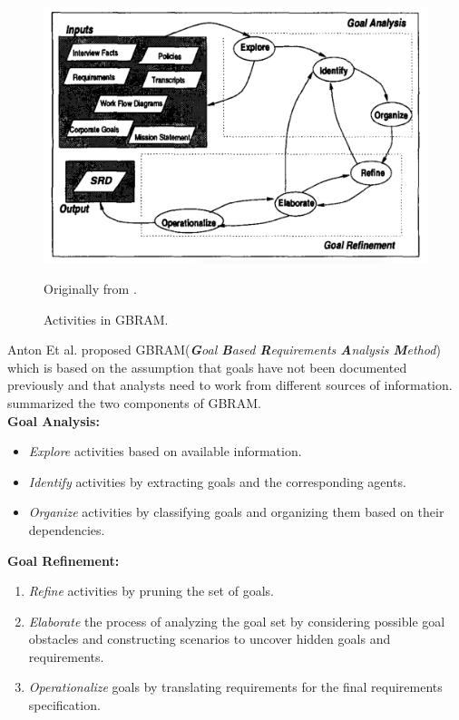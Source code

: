 \begin{figure}[hbtp]
    \centering
    \includegraphics[width=\textwidth]{Chapter-2/figs/GBRAM}
    \caption{Activities in GBRAM.}
    \medskip
    \small
    Originally from \cite{anton98}.
    \label{fig:gbram}
\end{figure}

Anton Et al. proposed GBRAM(\textit{\textbf{G}oal \textbf{B}ased \textbf{R}equirements \textbf{A}nalysis \textbf{M}ethod}) \cite{anton98} which is based on the assumption that goals have not been documented previously and that analysts need to work from different sources of information.  summarized the two components of GBRAM.\\
\textbf{Goal Analysis:}
\begin{itemize}
    \item \textit{Explore} activities based on available information.
    \item \textit{Identify} activities by extracting goals and the corresponding agents.
    \item \textit{Organize} activities by classifying goals and organizing them based on their dependencies.
\end{itemize}

\textbf{Goal Refinement:}
\begin{enumerate}
    \item \textit{Refine} activities by pruning the set of goals.
    \item \textit{Elaborate} the process of analyzing the goal set by considering possible goal obstacles and constructing scenarios to uncover hidden goals and requirements.
    \item \textit{Operationalize} goals by translating requirements for the final requirements specification.
\end{enumerate}

